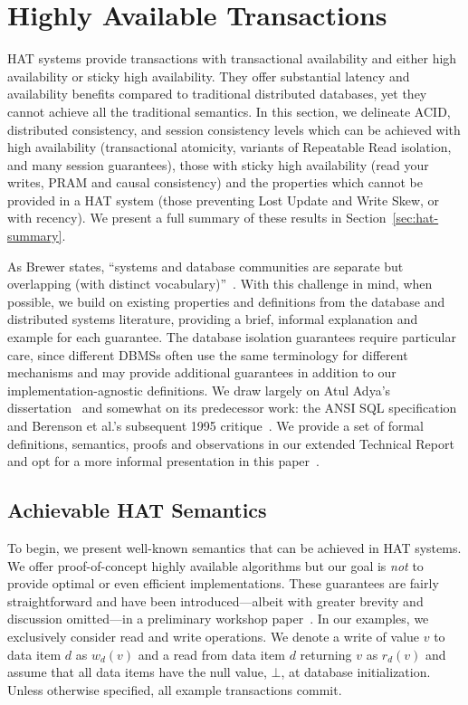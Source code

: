 
\section{Highly Available Transactions}
\label{sec:hats}

HAT systems provide transactions with transactional availability and
either high availability or sticky high availability. They offer
substantial latency and availability benefits compared to traditional
distributed databases, yet they cannot achieve all the traditional
semantics. In this section, we delineate ACID, distributed
consistency, and session consistency levels which can be achieved with
high availability (transactional atomicity, variants of Repeatable
Read isolation, and many session guarantees), those with sticky high
availability (read your writes, PRAM and causal consistency) and the
properties which cannot be provided in a HAT system (those preventing
Lost Update and Write Skew, or with recency).  We present a full
summary of these results in Section~\ref{sec:hat-summary}.

As Brewer states, ``systems and database communities are separate but
overlapping (with distinct vocabulary)''~\cite{brewer-slides}. With
this challenge in mind, when possible, we build on existing properties
and definitions from the database and distributed systems literature,
providing a brief, informal explanation and example for each
guarantee. The database isolation guarantees require particular care,
since different DBMSs often use the same terminology for different
mechanisms and may provide additional guarantees in addition to our
implementation-agnostic definitions.  We draw largely on Atul Adya's
dissertation~\cite{adya} and somewhat on its predecessor work: the
ANSI SQL specification~\cite{ansi-sql} and Berenson et al.'s
subsequent 1995 critique~\cite{ansicritique}. We provide a set of
formal definitions, semantics, proofs and observations in our extended
Technical Report and opt for a more informal presentation in this
paper~\cite{hat-tr}.

\subsection{Achievable HAT Semantics}

To begin, we present well-known semantics that can be achieved in HAT
systems. We offer proof-of-concept highly available algorithms but our
goal is \textit{not} to provide optimal or even efficient
implementations. These guarantees are fairly straightforward and have
been introduced---albeit with greater brevity and discussion
omitted---in a preliminary workshop paper~\cite{hat-hotos}. In our
examples, we exclusively consider read and write operations. We denote
a write of value $v$ to data item $d$ as $w_d(v)$ and a read from data
item $d$ returning $v$ as $r_d(v)$ and assume that all data items have
the null value, $\bot$, at database initialization. Unless otherwise
specified, all example transactions commit.

